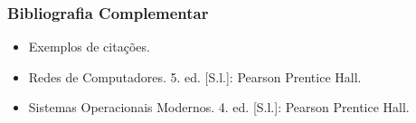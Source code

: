 \begin{frame}[t]\frametitle{Bibliografia Complementar}

  \begin{itemize}
    \justifying{}
    \setlength\itemsep{1em}
    \item Exemplos de citações.
    \item Redes de Computadores. 5. ed. [S.l.]: Pearson Prentice Hall. \cite{Tanenbaum2011}
    \item Sistemas Operacionais Modernos. 4. ed. [S.l.]: Pearson Prentice Hall. \cite{Tanenbaum2016}
  \end{itemize}

\end{frame}
